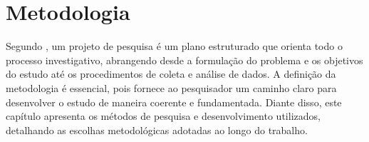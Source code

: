 \chapter{Metodologia}

Segundo , um projeto de pesquisa é um plano
estruturado que orienta todo o processo investigativo, abrangendo desde a
formulação do problema e os objetivos do estudo até os procedimentos de coleta
e análise de dados. A definição da metodologia é essencial, pois fornece ao
pesquisador um caminho claro para desenvolver o estudo de maneira coerente e
fundamentada. Diante disso, este capítulo apresenta os métodos de pesquisa e
desenvolvimento utilizados, detalhando as escolhas metodológicas adotadas ao
longo do trabalho.




%
%
